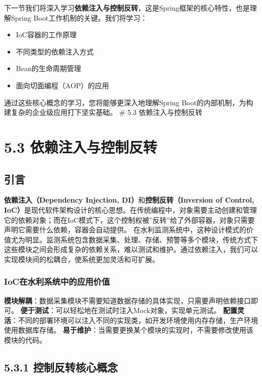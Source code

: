 下一节我们将深入学习\textbf{依赖注入与控制反转}，这是Spring框架的核心特性，也是理解Spring Boot工作机制的关键。我们将学习： \begin{itemize} \tightlist \item IoC容器的工作原理
\item 不同类型的依赖注入方式 \item Bean的生命周期管理 \item 面向切面编程（AOP）的应用 \end{itemize} 通过这些核心概念的学习，您将能够更深入地理解Spring
Boot的内部机制，为构建复杂的企业级应用打下坚实基础。 \# 5.3 依赖注入与控制反转 \section{5.3
依赖注入与控制反转}\label{ux4f9dux8d56ux6ce8ux5165ux4e0eux63a7ux5236ux53cdux8f6c} \learningobjectives{
}\subsection{引言}\label{ux5f15ux8a00-3} \textbf{依赖注入（Dependency Injection, DI）}和\textbf{控制反转（Inversion of Control,
IoC）}是现代软件架构设计的核心思想。在传统编程中，对象需要主动创建和管理它的依赖对象；而在IoC模式下，这个控制权被''反转''给了外部容器，对象只需要声明它需要什么依赖，容器会自动提供。
在水利监测系统中，这种设计模式的价值尤为明显。监测系统包含数据采集、处理、存储、预警等多个模块，传统方式下这些模块之间会形成复杂的依赖关系，难以测试和维护。通过依赖注入，我们可以实现模块间的松耦合，使系统更加灵活和可扩展。
\subsubsection{IoC在水利系统中的应用价值}\label{iocux5728ux6c34ux5229ux7cfbux7edfux4e2dux7684ux5e94ux7528ux4ef7ux503c}
\textbf{模块解耦}：数据采集模块不需要知道数据存储的具体实现，只需要声明依赖接口即可。 \textbf{便于测试}：可以轻松地在测试时注入Mock对象，实现单元测试。
\textbf{配置灵活}：不同的部署环境可以注入不同的实现类，如开发环境使用内存存储，生产环境使用数据库存储。 \textbf{易于维护}：当需要更换某个模块的实现时，不需要修改使用该模块的代码。 \subsection{5.3.1
控制反转核心概念}\label{ux63a7ux5236ux53cdux8f6cux6838ux5fc3ux6982ux5ff5}
